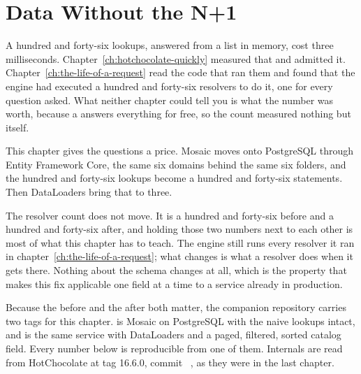 \chapter{Data Without the N+1}
\label{ch:data-without-the-n-plus-1}

A hundred and forty-six lookups, answered from a list in memory, cost three
milliseconds. Chapter~\ref{ch:hotchocolate-quickly} measured that and admitted
it. Chapter~\ref{ch:the-life-of-a-request} read the code that ran them and found
that the engine had executed a hundred and forty-six resolvers to do it, one for
every question asked. What neither chapter could tell you is what the number was
worth, because a  answers everything for free, so the count
measured nothing but itself.

This chapter gives the questions a price. Mosaic moves onto PostgreSQL through
Entity Framework Core, the same six domains behind the same six folders, and the
hundred and forty-six lookups become a hundred and forty-six statements. Then
DataLoaders bring that to three.

The resolver count does not move. It is a hundred and forty-six before and a
hundred and forty-six after, and holding those two numbers next to each other is
most of what this chapter has to teach. The engine still runs every resolver it
ran in chapter~\ref{ch:the-life-of-a-request}; what changes is what a resolver
does when it gets there. Nothing about the schema changes at all, which is the
property that makes this fix applicable one field at a time to a service already
in production.

Because the before and the after both matter, the companion repository carries
two tags for this chapter.  is Mosaic on PostgreSQL with the naive
lookups intact, and  is the same service with DataLoaders and a paged,
filtered, sorted catalog field. Every number below is reproducible from one of
them. Internals are read from HotChocolate at tag 16.6.0, commit
~\autocite{chillicream2026source}, as they were in the last
chapter.








